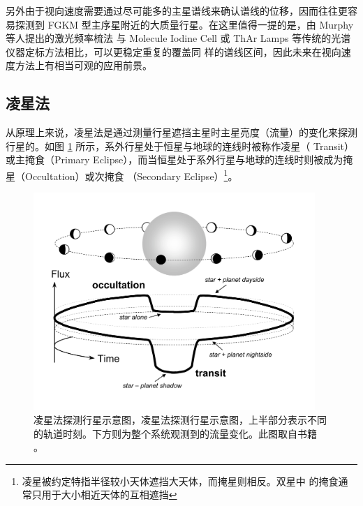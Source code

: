 另外由于视向速度需要通过尽可能多的主星谱线来确认谱线的位移，因而往往更容易探测到 FGKM 
型主序星附近的大质量行星。在这里值得一提的是，由 Murphy 等人提出的激光频率梳法\cite{Murphyetal2007lasercomb}
与 Molecule Iodine Cell 或 ThAr Lamps 等传统的光谱仪器定标方法相比，可以更稳定重复的覆盖同
样的谱线区间，因此未来在视向速度方法上有相当可观的应用前景。


\subsection{凌星法}

从原理上来说，凌星法是通过测量行星遮挡主星时主星亮度（流量）的变化来探测行星的。如图
 \ref{fig:transit} 所示，系外行星处于恒星与地球的连线时被称作凌星（ Transit）或主掩食（Primary 
Eclipse），而当恒星处于系外行星与地球的连线时则被成为掩星（Occultation）或次掩食
（Secondary Eclipse）\footnote{凌星被约定特指半径较小天体遮挡大天体，而掩星则相反。双星中
的掩食通常只用于大小相近天体的互相遮挡}。

\begin{figure}[ht]
\centering
\includegraphics[width=0.95\textwidth,angle=-90, trim={0 1cm 0 0}, scale=0.9]{figures/chapter1/fig6_transit.pdf}
\caption[凌星法探测行星示意图，上半部分表示不同的轨道时刻。下方则为整个系统观测到的流量变化。版权 Joshua Winn。]{凌星法探测行星示意图，凌星法探测行星示意图，上半部分表示不同的轨道时刻。下方则为整个系统观测到的流量变化。此图取自书籍 。}
\label{fig:transit}
\end{figure}

